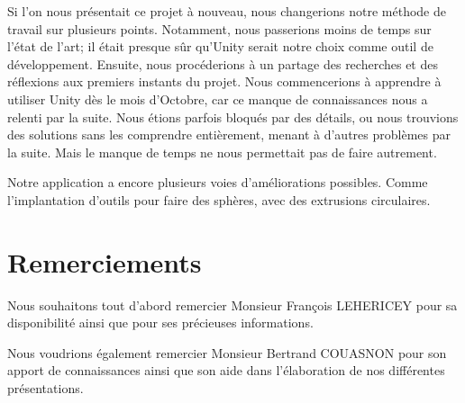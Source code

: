 \documentclass[a4paper,11pt]{article}
\begin{document}
			Si l'on nous présentait ce projet à nouveau, nous changerions notre méthode de travail sur plusieurs points. Notamment, nous passerions moins de temps sur l'état de l'art; il était presque sûr qu'Unity serait notre choix comme outil de développement. Ensuite, nous procéderions à un partage des recherches et des réflexions aux premiers instants du projet. Nous commencerions à apprendre à utiliser Unity dès le mois d'Octobre, car ce manque de connaissances nous a relenti par la suite. Nous étions parfois bloqués par des détails, ou nous trouvions des solutions sans les comprendre entièrement, menant à d'autres problèmes par la suite. Mais le manque de temps ne nous permettait pas de faire autrement.
			
			Notre application a encore plusieurs voies d'améliorations possibles. Comme l'implantation d'outils pour faire des sphères, avec des extrusions circulaires.
	
	\section{Remerciements}
		Nous souhaitons tout d'abord remercier Monsieur François LEHERICEY pour sa disponibilité ainsi que pour ses précieuses informations.
		
		Nous voudrions également remercier Monsieur Bertrand COUASNON pour son apport de connaissances ainsi que son aide dans l'élaboration de nos différentes présentations.
	
\end{document}
